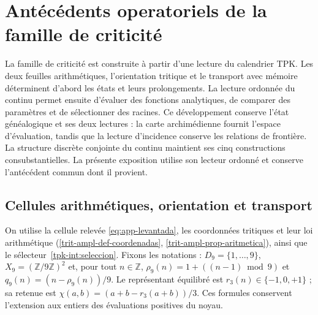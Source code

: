 \providecommand{\ZZ}{\mathbb Z}
\providecommand{\RR}{\mathbb R}
\providecommand{\FF}{\mathbb F}
\providecommand{\APP}{\mathrm{APP}}
\providecommand{\TPK}{\mathrm{TPK}}
\providecommand{\TRIT}{\{-1,0,+1\}}

\section{Antécédents operatoriels de la famille de criticité}
\label{hmtfg:antecedentes-operatorios}

La famille de criticité est construite à partir d’une lecture du calendrier TPK. Les deux feuilles arithmétiques, l’orientation tritique et le transport avec mémoire déterminent d’abord les états et leurs prolongements. La lecture ordonnée du continu permet ensuite d’évaluer des fonctions analytiques, de comparer des paramètres et de sélectionner des racines. Ce développement conserve l’état généalogique et ses deux lectures : la carte archimédienne fournit l’espace d’évaluation, tandis que la lecture d’incidence conserve les relations de frontière. La structure discrète conjointe du continu maintient ses cinq constructions consubstantielles. La présente exposition utilise son lecteur ordonné et conserve l’antécédent commun dont il provient.

\subsection{Cellules arithmétiques, orientation et transport}
\label{hmtfg:app-trit-transporte}

On utilise la cellule relevée \eqref{eq:app-levantada}, les coordonnées tritiques et leur loi arithmétique (\ref{trit-ampl-def-coordenadas}, \ref{trit-ampl-prop-aritmetica}), ainsi que le sélecteur~\ref{tpk-int:seleccion}. Fixons les notations : $D_9=\{1,\ldots,9\}$, $X_9=(\mathbb Z/9\mathbb Z)^2$ et, pour tout $n\in\mathbb Z$, $\rho_9(n)=1+((n-1)\bmod9)$ et $q_9(n)=(n-\rho_9(n))/9$. Le représentant équilibré est $r_3(n)\in\{-1,0,+1\}$ ; sa retenue est $\chi(a,b)=(a+b-r_3(a+b))/3$. Ces formules conservent l’extension aux entiers des évaluations positives du noyau.

